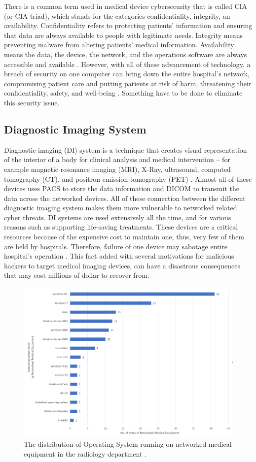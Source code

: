 \documentclass[pdf,bookmarks,colorlinks=true]{IEEEtran}
\begin{document}
There is a common term used in medical device cybersecurity that is called CIA (or CIA triad), which stands for the categories confidentiality, integrity, an availability. Confidentiality refers to protecting patients' information and ensuring that data are always available to people with legitimate needs. Integrity means preventing malware from altering patients' medical information. Availability means the data, the device, the network, and  the operations software are always accessible and available \cite{mahler2018know}. 
However, with all of these advancement of technology, a breach of security on one computer can bring down the entire hospital's network, compromising patient care and putting patients at risk of harm, threatening their confidentiality, safety, and well-being \cite{ferrara2019cybersecurity}. Something have to be done to eliminate this security issue.

\subsection{Diagnostic Imaging System}
Diagnostic imaging (DI) system is a technique that creates visual representation of the interior of a body for clinical analysis and medical intervention -- for example magnetic resonance imaging (MRI), X-Ray, ultrasound, computed tomography (CT), and positron emission tomography (PET) \cite{InformationSecurityonDiagnosticImagingSystem}. Almost all of these devices uses PACS to store the data information and DICOM to transmit the data across the networked devices. All of these connection between the different diagnostic imaging system makes them more vulnerable to networked related cyber threats. DI systems are used extensively all the time, and for various reasons such as supporting life-saving treatments. These devices are a critical resources because of the expensive cost to maintain one, thus, very few of them are held by hospitals. Therefore, failure of one device may sabotage entire hospital's operation \cite{mahler2018know}. This fact added with several motivations for malicious hackers to target medical imaging devices, can have a disastrous consequences that may cost millions of dollar to recover from.

\begin{figure}[tph]
	\centering
	\includegraphics[width=0.7\linewidth]{OSonRadiology}
	\caption{The distribution of Operating System running on networked medical equipment in the radiology department \cite{moses2015lack}.}
	\label{fig:osonradiology}
\end{figure}
\end{document}
